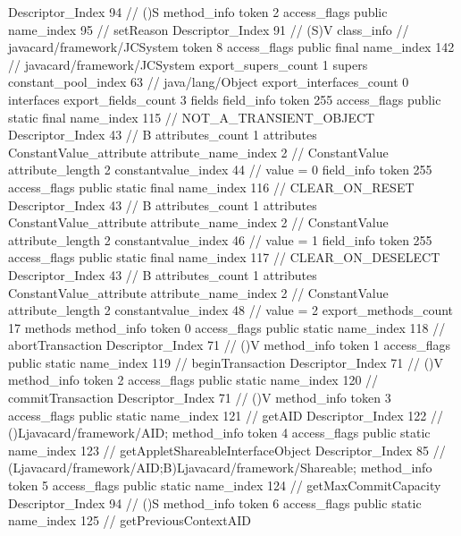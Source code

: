 {{{{{					Descriptor_Index	94		// ()S
				}
				method_info {
					token	2
					access_flags	public
					name_index	95		// setReason
					Descriptor_Index	91		// (S)V
				}
			}
		}
		class_info {		// javacard/framework/JCSystem
			token	8
			access_flags	public final
			name_index	142		// javacard/framework/JCSystem
			export_supers_count	1
			supers {
				constant_pool_index	63		// java/lang/Object
			}
			export_interfaces_count	0
			interfaces {
			}
			export_fields_count	3
			fields {
			field_info {
				token	255
				access_flags	public static final
				name_index	115		// NOT_A_TRANSIENT_OBJECT
				Descriptor_Index	43		// B
				attributes_count	1
				attributes {
				ConstantValue_attribute {
					attribute_name_index	2		// ConstantValue
					attribute_length	2
					constantvalue_index	44		// value = 0
				}
				}
			}
			field_info {
				token	255
				access_flags	public static final
				name_index	116		// CLEAR_ON_RESET
				Descriptor_Index	43		// B
				attributes_count	1
				attributes {
				ConstantValue_attribute {
					attribute_name_index	2		// ConstantValue
					attribute_length	2
					constantvalue_index	46		// value = 1
				}
				}
			}
			field_info {
				token	255
				access_flags	public static final
				name_index	117		// CLEAR_ON_DESELECT
				Descriptor_Index	43		// B
				attributes_count	1
				attributes {
				ConstantValue_attribute {
					attribute_name_index	2		// ConstantValue
					attribute_length	2
					constantvalue_index	48		// value = 2
				}
				}
			}
			}
			export_methods_count	17
			methods {
				method_info {
					token	0
					access_flags	public static
					name_index	118		// abortTransaction
					Descriptor_Index	71		// ()V
				}
				method_info {
					token	1
					access_flags	public static
					name_index	119		// beginTransaction
					Descriptor_Index	71		// ()V
				}
				method_info {
					token	2
					access_flags	public static
					name_index	120		// commitTransaction
					Descriptor_Index	71		// ()V
				}
				method_info {
					token	3
					access_flags	public static
					name_index	121		// getAID
					Descriptor_Index	122		// ()Ljavacard/framework/AID;
				}
				method_info {
					token	4
					access_flags	public static
					name_index	123		// getAppletShareableInterfaceObject
					Descriptor_Index	85		// (Ljavacard/framework/AID;B)Ljavacard/framework/Shareable;
				}
				method_info {
					token	5
					access_flags	public static
					name_index	124		// getMaxCommitCapacity
					Descriptor_Index	94		// ()S
				}
				method_info {
					token	6
					access_flags	public static
					name_index	125		// getPreviousContextAID
}}}}}
